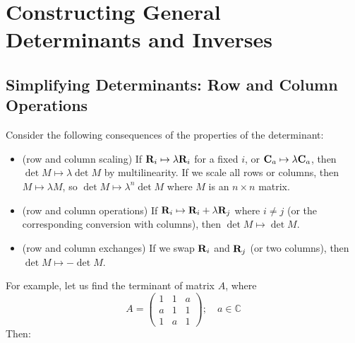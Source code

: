 \documentclass{article}
\begin{document}
\section{Constructing General Determinants and Inverses}
\subsection{Simplifying Determinants: Row and Column Operations}
Consider the following consequences of the properties of the determinant:
\begin{itemize}
    \item (row and column scaling) If $\vb R_i \mapsto \lambda \vb R_i$ for a fixed $i$, or $\vb C_a \mapsto \lambda \vb C_a$, then $\det M \mapsto \lambda \det M$ by multilinearity. If we scale all rows or columns, then $M \mapsto \lambda M$, so $\det M \mapsto \lambda^n \det M$ where $M$ is an $n \times n$ matrix.
    \item (row and column operations) If $\vb R_i \mapsto \vb R_i + \lambda \vb R_j$ where $i \neq j$ (or the corresponding conversion with columns), then $\det M \mapsto \det M$.
    \item (row and column exchanges) If we swap $\vb R_i$ and $\vb R_j$ (or two columns), then $\det M \mapsto -\det M$.
\end{itemize}
For example, let us find the terminant of matrix $A$, where
\[ A = \begin{pmatrix}
        1 & 1 & a \\ a & 1 & 1 \\ 1 & a & 1
    \end{pmatrix};\quad a \in \mathbb C \]
Then:
\end{document}
